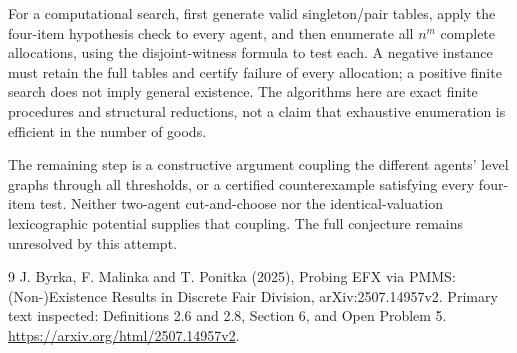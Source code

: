 \documentclass[11pt]{article}
\begin{document}
For a computational search, first generate valid singleton/pair tables, apply the four-item hypothesis check to every agent, and then enumerate all $n^m$ complete allocations, using the disjoint-witness formula to test each. A negative instance must retain the full tables and certify failure of every allocation; a positive finite search does not imply general existence. The algorithms here are exact finite procedures and structural reductions, not a claim that exhaustive enumeration is efficient in the number of goods.

The remaining step is a constructive argument coupling the different agents' level graphs through all thresholds, or a certified counterexample satisfying every four-item test. Neither two-agent cut-and-choose nor the identical-valuation lexicographic potential supplies that coupling. The full conjecture remains unresolved by this attempt.

\begin{thebibliography}{9}
 J. Byrka, F. Malinka and T. Ponitka (2025), Probing EFX via PMMS: (Non-)Existence Results in Discrete Fair Division, arXiv:2507.14957v2. Primary text inspected: Definitions 2.6 and 2.8, Section 6, and Open Problem 5. \url{https://arxiv.org/html/2507.14957v2}.
\end{thebibliography}
\end{document}
